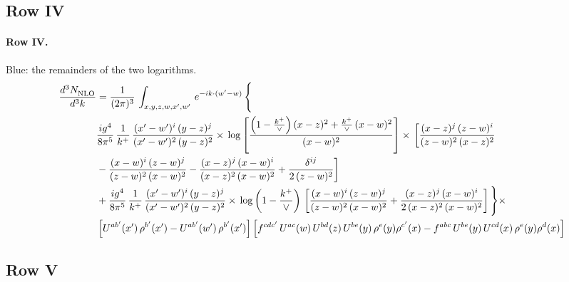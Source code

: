 \documentclass[10pt]{article}
\numberwithin{equation}{section}
\newcommand{\new}[1]{{\color{blue}#1}}
\begin{document}
\subsection{Row IV}
\paragraph{Row IV.}
\new{Blue}: the remainders of the two logarithms.
\begin{align}
    \frac{d^{3}N_{\rm NLO}^{\rm}}{d^{3}k}  & =   \frac{1}{(2\pi)^{3}}\,
    \int_{x,y,z,w,x',w'}\,e^{-ik\cdot (w^\prime-w)}\,\Bigg\{\notag \\
& \frac{ig^{4}}{8\pi^{5}}\,\frac{1}{k^{+}}\,\frac{(x'-w')^{i}\,(y-z)^{j}}{(x'-w')^{2}\,(y-z)^{2}}\times\,\log{\left[\frac{\left(1-\frac{k^{+}}{\vee}\right)(x-z)^{2}+\frac{k^{+}}{\vee}\,(x-w)^{2}}{(x-w)^{2}}\right]}\times\, \bigg[\frac{(x-z)^{j}\,(z-w)^{i}}{(z-w)^{2}\,(x-z)^{2}}\notag \\ & -\frac{(x-w)^{i}\,(z-w)^{j}}{(z-w)^{2}\,(x-w)^{2}}-\frac{(x-z)^{j}\,(x-w)^{i}}{(x-z)^{2}\,(x-w)^{2}}+\frac{\delta^{ij}}{2\,(z-w)^{2}}\bigg] \notag \\
& + \frac{ig^{4}}{8\pi^{5}}\,\frac{1}{k^{+}}\,\frac{(x'-w')^{i}\,(y-z)^{j}}{(x'-w')^{2}\,(y-z)^{2}}\times\,\log{\left(1-\frac{k^{+}}{\vee}\right)}\,\left[\frac{(x-w)^{i}\,(z-w)^{j}}{(z-w)^{2}\,(x-w)^{2}}+\frac{(x-z)^{j}\,(x-w)^{i}}{2\, (x-z)^{2}\,(x-w)^{2}}\right]\Bigg\}\times\notag \\ &  \left[U^{ab'}(x')\,\rho^{b'}(x')-U^{ab'}(w')\,\rho^{b'}(x')\right] \left[f^{cdc'}\,U^{ac}(w)\,U^{bd}(z)\,U^{be}(y)\,\rho^{e}(y)\rho^{c'}(x)-f^{abc}\,U^{be}(y)\,U^{cd}(x)\,\rho^{e}(y)\rho^{d}(x)\right] \label{eq:F:G1IV}
\end{align}

\subsection{Row V}
\end{document}
